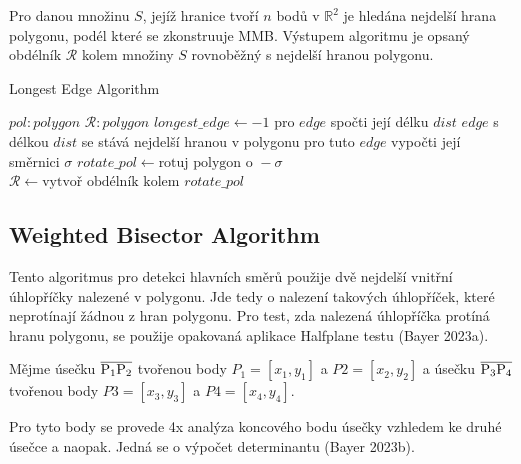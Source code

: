 \par Pro danou množinu $S$, jejíž hranice tvoří $n$ bodů v $\mathbb{R}^2$ je hledána nejdelší hrana polygonu, podél které se zkonstruuje MMB. Výstupem algoritmu je opsaný obdélník $\mathcal{R}$ kolem množiny $S$ rovnoběžný s nejdelší hranou polygonu.

\begin{algorithm}[h]
\caption{Longest Edge Algorithm}\label{alg:cap}
\begin{algorithmic}
\Require $pol: polygon$
\Ensure $\mathcal{R}: polygon$
\State
\State $longest\_edge \gets -1$ 
\State
{}
    \State pro $edge$ spočti její délku $dist$
    \State
     
    \State  $edge$ s délkou $dist$ se stává nejdelší hranou v polygonu
    \State pro tuto $edge$ vypočti její směrnici $\sigma$
    \EndIf
\EndFor
\State
\State $rotate\_pol \gets {\text{rotuj polygon o }}- \sigma$ 
\State $\mathcal{R} \gets {\text{vytvoř obdélník kolem }} rotate\_pol$ 
\State
{}

\end{algorithmic}
\end{algorithm}
\newpage

\bigbreak

\subsection*{Weighted Bisector Algorithm}

\par Tento algoritmus pro detekci hlavních směrů použije dvě nejdelší vnitřní úhlopříčky nalezené v polygonu. Jde tedy o nalezení takových úhlopříček, které neprotínají žádnou z hran polygonu. Pro test, zda nalezená úhlopříčka protíná hranu polygonu, se použije opakovaná aplikace Halfplane testu (Bayer 2023a).

\par Mějme úsečku $\overline{\rm P_1P_2}$ tvořenou body $P_1 = [x_1, y_1]$ a $P2 = [x_2, y_2]$ a úsečku $\overline{\rm P_3P_4}$ tvořenou body \newline $P3 = [x_3, y_3]$ a $P4 = [x_4, y_4]$. 
\par Pro tyto body se provede 4x analýza koncového bodu úsečky vzhledem ke druhé úsečce a naopak. Jedná se o výpočet determinantu (Bayer 2023b).

